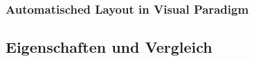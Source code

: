 
\subsubsection{Automatisched Layout in Visual Paradigm}



\subsection{Eigenschaften und Vergleich}









